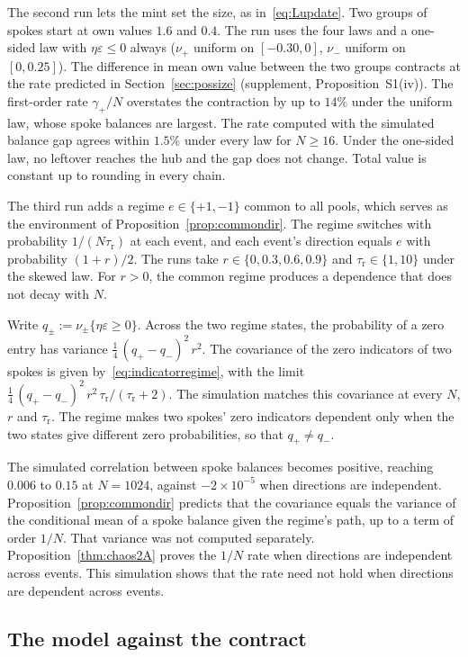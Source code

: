 \documentclass[11pt,a4paper]{article}
\theoremstyle{siphon}
\begin{document}
The second run lets the mint set the size, as in~\eqref{eq:Lupdate}. Two groups of spokes start at own values $1.6$ and $0.4$. The run uses the four laws and a one-sided law with $\eta\varepsilon \leq 0$ always ($\nu_+$ uniform on $[-0.30, 0]$, $\nu_-$ uniform on $[0, 0.25]$). The difference in mean own value between the two groups contracts at the rate predicted in Section~\ref{sec:possize} (supplement, Proposition~S1(iv)). The first-order rate $\gamma_+/N$ overstates the contraction by up to $14\%$ under the uniform law, whose spoke balances are largest. The rate computed with the simulated balance gap agrees within $1.5\%$ under every law for $N \geq 16$. Under the one-sided law, no leftover reaches the hub and the gap does not change. Total value is constant up to rounding in every chain.

The third run adds a regime $e \in \{+1, -1\}$ common to all pools, which serves as the environment of Proposition~\ref{prop:commondir}. The regime switches with probability $1/(N\tau_{\mathrm{r}})$ at each event, and each event's direction equals $e$ with probability $(1 + r)/2$. The runs take $r \in \{0, 0.3, 0.6, 0.9\}$ and $\tau_{\mathrm{r}} \in \{1, 10\}$ under the skewed law. For $r > 0$, the common regime produces a dependence that does not decay with $N$.

Write $q_\pm := \nu_\pm\{\eta\varepsilon \geq 0\}$. Across the two regime states, the probability of a zero entry has variance $\tfrac14\,(q_+ - q_-)^2\,r^2$. The covariance of the zero indicators of two spokes is given by~\eqref{eq:indicatorregime}, with the limit $\tfrac14\,(q_+ - q_-)^2\,r^2\,\tau_{\mathrm{r}}/(\tau_{\mathrm{r}} + 2)$. The simulation matches this covariance at every $N$, $r$ and $\tau_{\mathrm{r}}$. The regime makes two spokes' zero indicators dependent only when the two states give different zero probabilities, so that $q_+ \neq q_-$.

The simulated correlation between spoke balances becomes positive, reaching $0.006$ to $0.15$ at $N = 1024$, against $-2 \times 10^{-5}$ when directions are independent. Proposition~\ref{prop:commondir} predicts that the covariance equals the variance of the conditional mean of a spoke balance given the regime's path, up to a term of order $1/N$. That variance was not computed separately. Proposition~\ref{thm:chaos2A} proves the $1/N$ rate when directions are independent across events. This simulation shows that the rate need not hold when directions are dependent across events.

\subsection{The model against the contract}\label{sec:model_contract}
\end{document}
